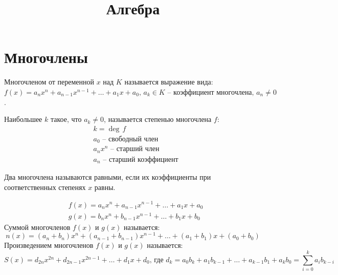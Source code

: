 \documentclass[12pt]{article}
\title{\textbf{Алгебра}}\date{}\author{}
\begin{document}
\maketitle
\tableofcontents
\label{toc}
\newpage

\section{Многочлены}

\begin{definition}
    Многочленом от переменной $x$ над $K$ называется выражение вида: $f(x)=a_nx^n+a_{n-1}x^{n-1}+\ldots+a_1x+a_0,\, a_k\in K\text{ -- коэффициент многочлена},\, a_n\neq0$.
\end{definition}

\begin{definition}
    Наибольшее $k$ такое, что $a_k\neq0$, называется степенью многочлена $f$:
    \begin{align*}
        &k = \deg\,f\\
        &a_0\text{ -- свободный член}\\
        &a_nx^n\text{ -- старший член}\\
        &a_n\text{ -- старший коэффициент}
    \end{align*}
\end{definition}

\begin{definition}
    Два многочлена называются равными, если их коэффициенты при соответственных степенях $x$ равны.
\end{definition}

\begin{definition}
    \begin{align*}
        &f(x)=a_nx^n+a_{n-1}x^{n-1}+\ldots+a_1x+a_0\\
        &g(x)=b_nx^n+b_{n-1}x^{n-1}+\ldots+b_1x+b_0
    \end{align*}
    Суммой многочленов $f(x)$ и $g(x)$ называется: $$n(x)=(a_n+b_n)x^n+(a_{n-1}+b_{n-1})x^{n-1}+\ldots+(a_1+b_1)x+(a_0+b_0)$$ Произведением многочленов $f(x)$ и $g(x)$ называется: $$S(x)=d_{2n}x^{2n}+d_{2n-1}x^{2n-1}+\ldots+d_1x+d_0\text{, где } d_k=a_0b_k+a_1b_{k-1}+\ldots+a_{k-1}b_1+a_kb_0=\sum_{i=0}^ka_ib_{k-i}$$
\end{definition}
\end{document}
